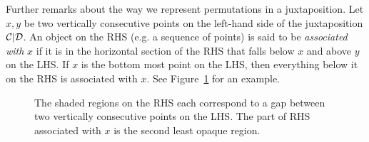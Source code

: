 \message{ !name(thesis.tex)}\documentclass[12pt, a4paper, twoside]{report}
\begin{document}
Further remarks about the way we represent permutations in a juxtaposition. Let $x,y$ be two vertically consecutive points on the left-hand side of the juxtaposition $\mathcal{C}|\mathcal{D}$. An object on the RHS (e.g. a sequence of points) is said to be \emph{associated with} $x$ if it is in the horizontal section of the RHS that falls below $x$ and above $y$ on the LHS. If $x$ is the bottom most point on the LHS, then everything below it on the RHS is associated with $x$. See Figure~\ref{fig:xregion} for an example.
\begin{figure}[ht]
  \centering
  \caption{The shaded regions on the RHS each correspond to a gap between two vertically consecutive points on the LHS. The part of RHS associated with $x$ is the second least opaque region.}
  \label{fig:xregion}
\end{figure}

\end{document}
